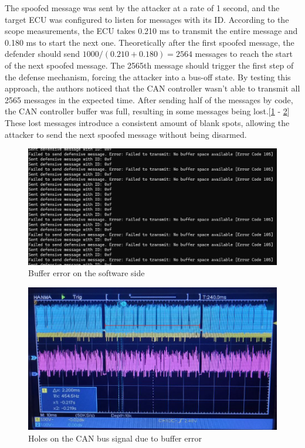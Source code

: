 \documentclass[10pt,twocolumn,letterpaper]{article}
\begin{document}
The spoofed message was sent by the attacker at a rate of 1 second, and the target ECU was configured to listen for messages with its ID. 
According to the scope measurements, the ECU takes 0.210 ms to transmit the entire message and 0.180 ms to start the next one.
Theoretically after the first spoofed message, the defender should send $1000/(0.210 + 0.180) = 2564$ messages to reach the start of the next spoofed message.
The 2565th message should trigger the first step of the defense mechanism, forcing the attacker into a bus-off state.
By testing this approach, the authors noticed that the CAN controller wasn't able to transmit all 2565 messages in the expected time. After sending half of the messages by code, the CAN controller buffer
was full, resulting in some messages being lost.[\ref{fig:lost_messages} - \ref{fig:scope}]
These lost messages introduce a consistent amount of blank spots, allowing the attacker to send the next spoofed message without being disarmed.
\begin{figure}
    \centering
    \includegraphics[width=0.9\linewidth]{buffer_full.png}
    \caption{Buffer error on the software side}
    \label{fig:lost_messages}
\end{figure}
\begin{figure}
    \centering
    \includegraphics[width=0.9\linewidth]{scope.png}
    \caption{Holes on the CAN bus signal due to buffer error}
    \label{fig:scope}
\end{figure}
\end{document}
